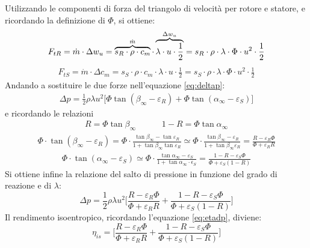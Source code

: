 Utilizzando le componenti di forza del triangolo di velocità per rotore e statore, e ricordando la definizione di $\Phi$, si ottiene:
\begin{align*}
F_{tR} = \dot{m} \cdot \Delta w_u = \overbrace{s_R \cdot \rho \cdot c_m}^\text{$ \dot{m} $} \cdot \overbrace{\lambda \cdot u \cdot \frac{1}{2}}^\text{$\Delta w_u$}=  s_R \cdot \rho \cdot \lambda \cdot \Phi \cdot u^2 \cdot \frac{1}{2}
\end{align*}
\begin{align*}
F_{tS} = \dot{m} \cdot \Delta c_m = s_S \cdot \rho \cdot c_m \cdot \lambda \cdot u \cdot \frac{1}{2} =s_S \cdot \rho \cdot \lambda \cdot \Phi \cdot u^2 \cdot \frac{1}{2}
\end{align*}
Andando a sostituire le due forze nell'equazione \ref{eq:deltap}:
\begin{align*}
\Delta p = \frac{1}{2} \rho \lambda u^2 \big[\Phi \tan \left( \beta_{\infty} - \varepsilon_R \right) + \Phi \tan \left( \alpha_{\infty} - \varepsilon_S \right) \big]
\end{align*}
e ricordando le relazioni
\begin{align*}
R = \Phi \tan \beta_{\infty} \;\;\;\;\;\;\;\;\;\;\; 1 - R = \Phi \tan \alpha_{\infty} 
\end{align*}
\begin{align*}
\Phi \cdot \tan ( \beta_{\infty} - \varepsilon_R ) = \Phi \cdot \frac{\tan \beta_{\infty} - \tan \varepsilon_R}{1 + \tan \beta_{\infty} \tan \varepsilon_R} \simeq \Phi \cdot \frac{\tan \beta_{\infty} - \varepsilon_R}{1 + \tan \beta_{\infty} \varepsilon_R}= \frac{R - \varepsilon_R \Phi}{\Phi + \varepsilon_R R}
\end{align*}
\begin{align*}
\Phi \cdot \tan (\alpha_{\infty} - \varepsilon_S) \simeq \Phi \cdot \frac{\tan \alpha_{\infty} - \varepsilon_S}{1 + \tan \alpha_{\infty} \cdot \epsilon_S} = \frac{1 - R - \varepsilon_S \Phi}{\Phi + \varepsilon_S (1-R)}
\end{align*}
Si ottiene infine la relazione del salto di pressione in funzione del grado di reazione e di $\lambda$:
\begin{equation}
\Delta p = \frac{1}{2} \rho \lambda u^2 \Bigg[ \frac{R - \varepsilon_R \Phi}{\Phi + \varepsilon_R R} + \frac{1 - R - \varepsilon_S \Phi}{\Phi + \varepsilon_S (1-R)} \Bigg]
\end{equation}
Il rendimento isoentropico, ricordando l'equazione \ref{eq:etadp}, diviene:
\begin{equation}
\boxed{ \eta_{is} = \Bigg[ \frac{R - \varepsilon_R \Phi}{\Phi + \varepsilon_R R} + \frac{1 - R - \varepsilon_S \Phi}{\Phi + \varepsilon_S (1-R)} \Bigg] }
\end{equation}
